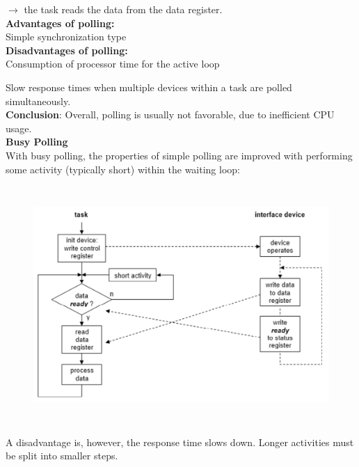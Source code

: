 $\rightarrow$ the task reads the data from the data register.\\

\textbf{Advantages of polling:}\\

\hspace{1cm} Simple synchronization type\\

\textbf{Disadvantages of polling:}\\

\hspace{1cm} Consumption of processor time for the active loop

\hspace{1cm} Slow response times when multiple devices within a task are polled simultaneously.\\

\textbf{Conclusion}: Overall, polling is usually not favorable, due to inefficient CPU usage.\\

{\rot\bf Busy Polling}\\

With busy polling, the properties of simple polling are improved with performing some activity (typically short) within the waiting loop:

 	\begin{figure}[h]
    \centering
    \includegraphics[width=14cm, height=9cm]{Images/image124.png}
    \label{fig:Fig }
    \end{figure}

A disadvantage is, however, the response time slows down. Longer activities must be split into smaller steps.\\

